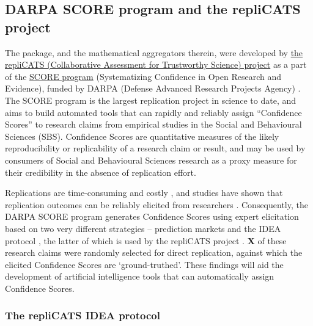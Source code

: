 \documentclass[article]{jss}
\begin{document}
\hypertarget{sec-repliCATS}{%
\subsection{DARPA SCORE program and the repliCATS
project}\label{sec-repliCATS}}

The  package, and the mathematical aggregators therein,
were developed by \href{https://replicats.research.unimelb.edu.au/}{the
repliCATS (Collaborative Assessment for Trustworthy Science) project} as
a part of the
\href{https://www.darpa.mil/program/systematizing-confidence-in-open-research-and-evidence}{SCORE
program} (Systematizing Confidence in Open Research and Evidence),
funded by DARPA (Defense Advanced Research Projects Agency)
\citep{alipourfard2021}. The SCORE program is the largest replication
project in science to date, and aims to build automated tools that can
rapidly and reliably assign ``Confidence Scores'' to research claims
from empirical studies in the Social and Behavioural Sciences (SBS).
Confidence Scores are quantitative measures of the likely
reproducibility or replicability of a research claim or result, and may
be used by consumers of Social and Behavioural Sciences research as a
proxy measure for their credibility in the absence of replication
effort.

Replications are time-consuming and costly \citep{Isager2020}, and
studies have shown that replication outcomes can be reliably elicited
from researchers \citep{Gordon2020}. Consequently, the DARPA SCORE
program generates Confidence Scores using expert elicitation based on
two very different strategies -- prediction markets \citep{Gordon2020}
and the IDEA protocol \citep{hemming2017}, the latter of which is used
by the repliCATS project \citep{Fraser:2021}. \textbf{X} of these
research claims were randomly selected for direct replication, against
which the elicited Confidence Scores are `ground-truthed'. These
findings will aid the development of artificial intelligence tools that
can automatically assign Confidence Scores.

\hypertarget{sec-IDEAprotocol}{%
\subsubsection{The repliCATS IDEA protocol}\label{sec-IDEAprotocol}}
\end{document}
